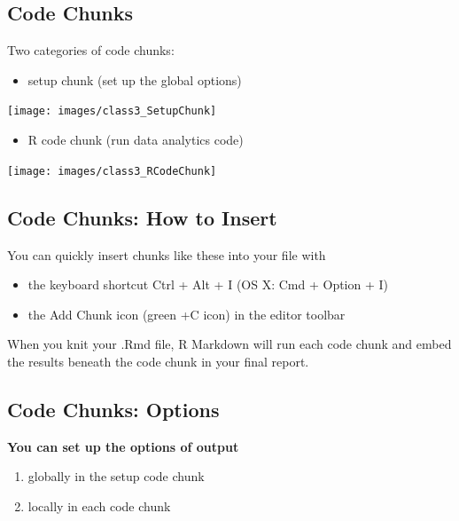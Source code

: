\documentclass[
  11pt,
]{book}
\providecommand{\tightlist}{%
  \setlength{\itemsep}{0pt}\setlength{\parskip}{0pt}}
\begin{document}
\hypertarget{code-chunks}{%
\subsection{Code Chunks}\label{code-chunks}}

Two categories of code chunks:

\begin{itemize}
\tightlist
\item
  setup chunk (set up the global options)
\end{itemize}

\begin{center}\texttt{[image: images/class3\_SetupChunk]} \end{center}

\begin{itemize}
\tightlist
\item
  R code chunk (run data analytics code)
\end{itemize}

\begin{center}\texttt{[image: images/class3\_RCodeChunk]} \end{center}

\hypertarget{code-chunks-how-to-insert}{%
\subsection{Code Chunks: How to Insert}\label{code-chunks-how-to-insert}}

You can quickly insert chunks like these into your file with

\begin{itemize}
\tightlist
\item
  the keyboard shortcut Ctrl + Alt + I (OS X: Cmd + Option + I)
\item
  the Add Chunk icon (green +C icon) in the editor toolbar
\end{itemize}

When you knit your .Rmd file, R Markdown will run each code chunk and embed the results beneath the code chunk in your final report.

\hypertarget{code-chunks-options}{%
\subsection{Code Chunks: Options}\label{code-chunks-options}}

\textbf{You can set up the options of output}

\begin{enumerate}
\def\labelenumi{\arabic{enumi}.}
\tightlist
\item
  globally in the setup code chunk
\item
  locally in each code chunk
\end{enumerate}
\end{document}
